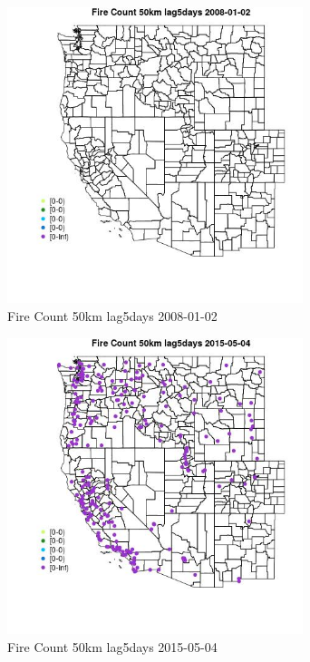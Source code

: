 \begin{figure} 
\centering  
\includegraphics[width=0.77\textwidth]{Code_Outputs/Report_ML_input_PM25_Step4_part_e_de_duplicated_aves_compiled_2019-05-18wNAs_MapObsFire_Count_50km_lag5days2008-01-02.jpg} 
\caption{\label{fig:Report_ML_input_PM25_Step4_part_e_de_duplicated_aves_compiled_2019-05-18wNAsMapObsFire_Count_50km_lag5days2008-01-02}Fire Count 50km lag5days 2008-01-02} 
\end{figure} 
 

\begin{figure} 
\centering  
\includegraphics[width=0.77\textwidth]{Code_Outputs/Report_ML_input_PM25_Step4_part_e_de_duplicated_aves_compiled_2019-05-18wNAs_MapObsFire_Count_50km_lag5days2015-05-04.jpg} 
\caption{\label{fig:Report_ML_input_PM25_Step4_part_e_de_duplicated_aves_compiled_2019-05-18wNAsMapObsFire_Count_50km_lag5days2015-05-04}Fire Count 50km lag5days 2015-05-04} 
\end{figure} 
 

